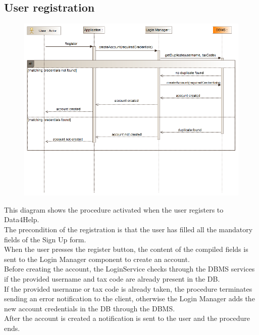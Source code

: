 \subsection{User registration}
\begin{figure}[H]
\centering
\includegraphics[width=\linewidth]{resources/uml/sequence/Registration.png}
\end{figure}
This diagram shows the procedure activated when the user registers to Data4Help.\\
The precondition of the registration is that the user has filled all the mandatory fields of the Sign Up form.\\
When the user presses the register button, the content of the compiled fields is sent to the Login Manager component to create an account.\\
Before creating the account, the LoginService checks through the DBMS services if the provided username and tax code are already present in the DB.\\
If the provided username or tax code is already taken, the procedure terminates sending an error notification to the client, otherwise the Login Manager adds the new account credentials in the DB through the DBMS.\\
After the account is created a notification is sent to the user and the procedure ends.


